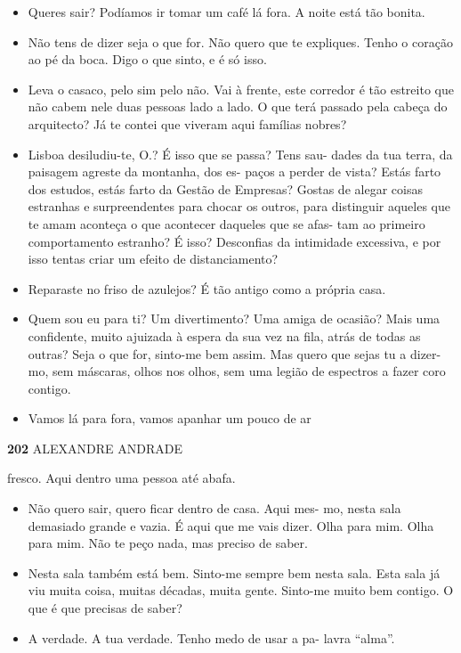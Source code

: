 \begin{itemize}
\tightlist
\item
  Queres sair? Podíamos ir tomar um café lá fora. A noite está tão
  bonita.
\item
  Não tens de dizer seja o que for. Não quero que te expliques. Tenho o
  coração ao pé da boca. Digo o que sinto, e é só isso.
\item
  Leva o casaco, pelo sim pelo não. Vai à frente, este corredor é tão
  estreito que não cabem nele duas pessoas lado a lado. O que terá
  passado pela cabeça do arquitecto? Já te contei que viveram aqui
  famílias nobres?
\item
  Lisboa desiludiu-te, O.? É isso que se passa? Tens sau- dades da tua
  terra, da paisagem agreste da montanha, dos es- paços a perder de
  vista? Estás farto dos estudos, estás farto da Gestão de Empresas?
  Gostas de alegar coisas estranhas e surpreendentes para chocar os
  outros, para distinguir aqueles que te amam aconteça o que acontecer
  daqueles que se afas- tam ao primeiro comportamento estranho? É isso?
  Desconfias da intimidade excessiva, e por isso tentas criar um efeito
  de distanciamento?
\item
  Reparaste no friso de azulejos? É tão antigo como a própria casa.
\item
  Quem sou eu para ti? Um divertimento? Uma amiga de ocasião? Mais uma
  confidente, muito ajuizada à espera da sua vez na fila, atrás de todas
  as outras? Seja o que for, sinto-me bem assim. Mas quero que sejas tu
  a dizer-mo, sem máscaras, olhos nos olhos, sem uma legião de espectros
  a fazer coro contigo.
\item
  Vamos lá para fora, vamos apanhar um pouco de ar
\end{itemize}

\textbf{202 }ALEXANDRE ANDRADE

fresco. Aqui dentro uma pessoa até abafa.

\begin{itemize}
\tightlist
\item
  Não quero sair, quero ficar dentro de casa. Aqui mes- mo, nesta sala
  demasiado grande e vazia. É aqui que me vais dizer. Olha para mim.
  Olha para mim. Não te peço nada, mas preciso de saber.
\item
  Nesta sala também está bem. Sinto-me sempre bem nesta sala. Esta sala
  já viu muita coisa, muitas décadas, muita gente. Sinto-me muito bem
  contigo. O que é que precisas de saber?
\item
  A verdade. A tua verdade. Tenho medo de usar a pa- lavra ``alma''.
\end{itemize}

